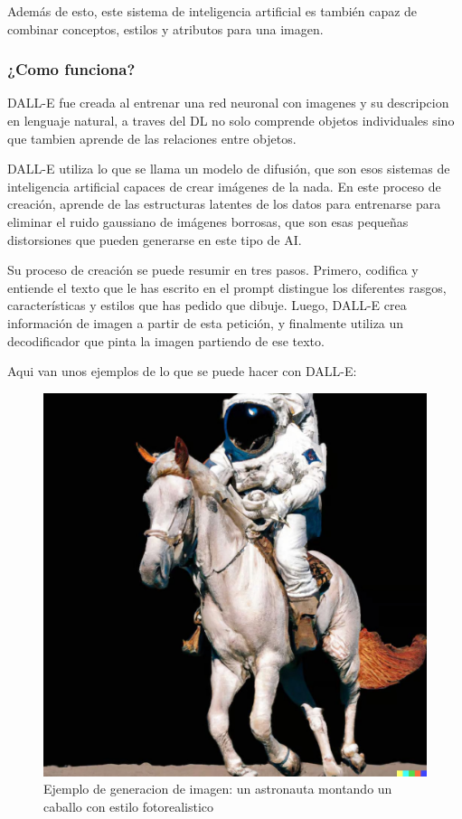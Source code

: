 \documentclass[runningheads]{llncs} %
\begin{document}
Además de esto, este sistema de inteligencia artificial es también capaz de combinar
conceptos, estilos y atributos para una imagen. 

\subsubsection{¿Como funciona?}
DALL-E fue creada al entrenar una red neuronal con imagenes y su descripcion en lenguaje
natural, a traves del DL no solo comprende objetos individuales sino que tambien aprende 
de las relaciones entre objetos. \cite{ej-dalle}

DALL-E utiliza lo que se llama un modelo de difusión, que son esos sistemas 
de inteligencia artificial capaces de crear imágenes de la nada. 
En este proceso de creación, aprende de las estructuras latentes de los datos 
para entrenarse para eliminar el ruido gaussiano de imágenes borrosas, 
que son esas pequeñas distorsiones que pueden generarse en este tipo de AI. 
\cite{dalle-xtaka}

Su proceso de creación se puede resumir en tres pasos. 
Primero, codifica y entiende el texto que le has escrito en el prompt 
distingue los diferentes rasgos, características y estilos que has pedido que dibuje.
Luego, DALL-E crea información de imagen a partir de esta petición, y finalmente 
utiliza un decodificador que pinta la imagen partiendo de ese texto. \cite{dalle-xtaka}

Aqui van unos ejemplos de lo que se puede hacer con DALL-E:

\begin{figure}
    \centering
    \includegraphics[scale=0.19]{ej1-dalle.jpg}
    \caption{Ejemplo de generacion de imagen: un astronauta montando un
    caballo con estilo fotorealistico \cite{ej-dalle}}
    \label{fig:dalle-ej1}
\end{figure}
\end{document}
